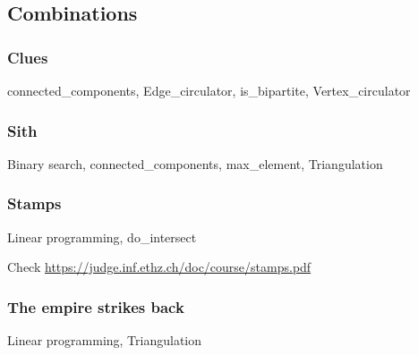 \documentclass[10pt,a4paper,landscape,twocolumn,twoside]{article}
\begin{document}
	\newpage
	\subsection{Combinations}

		\subsubsection{Clues}
		\label{subs:Clues}
		\begin{keywords}connected\_components, Edge\_circulator, is\_bipartite, Vertex\_circulator\end{keywords}
		

		\subsubsection{Sith}
		\label{subs:Sith}
		\begin{keywords}Binary search, connected\_components, max\_element, Triangulation\end{keywords}
		

		\subsubsection{Stamps}
		\label{subs:Stamps}
		\begin{keywords}Linear programming, do\_intersect\end{keywords}

		Check \url{https://judge.inf.ethz.ch/doc/course/stamps.pdf}
		

		\subsubsection{The empire strikes back}
		\label{subs:The empire strikes back}
		\begin{keywords}Linear programming, Triangulation\end{keywords}
		

\printindex
\end{document}

